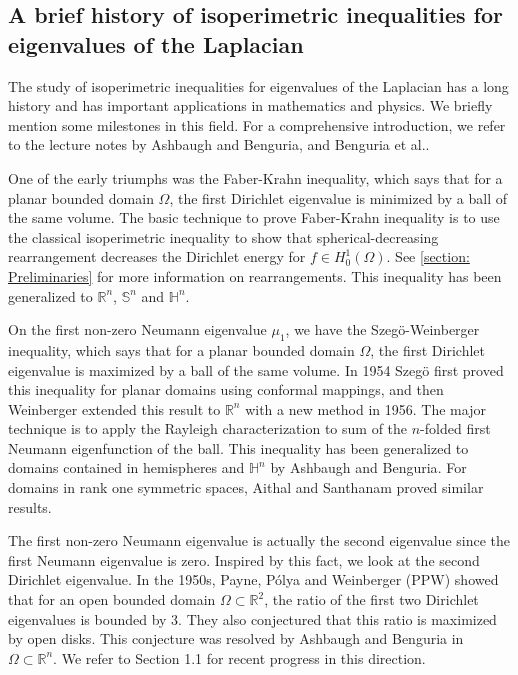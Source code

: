 \documentclass{amsart}
\numberwithin{equation}{section}
\theoremstyle{plain}
\theoremstyle{definition}
\theoremstyle{remark}
\def\RR {\mathbb{R}}
\def\HH {\mathbb{H}}
\def\SS {\mathbb{S}}
\begin{document}
\subsection{A brief history of isoperimetric inequalities for eigenvalues of the Laplacian}\label{brief history}
The study of isoperimetric inequalities for eigenvalues of the Laplacian has a long history and has important applications in mathematics and physics. We briefly mention some milestones in this field. For a comprehensive introduction, we refer to the lecture notes by Ashbaugh and Benguria\cite{ashbaugh2007isoperimetric}, and Benguria et al.\cite{benguria2012isoperimetric}. 
\par One of the early triumphs was the Faber-Krahn inequality, which says that for a planar bounded domain $\Omega$, the first Dirichlet eigenvalue is minimized by a ball of the same volume. The basic technique to prove Faber-Krahn inequality is to use the classical isoperimetric inequality to show that spherical-decreasing rearrangement decreases the Dirichlet energy for $f\in H_0^1(\Omega)$. See \cref{section: Preliminaries} for more information on rearrangements. This inequality has been generalized to $\RR^n$, $\SS^n$ and $\HH^n$. 
\par On the first non-zero Neumann eigenvalue $\mu_1$, we have the Szegö-Weinberger inequality, which says that for a planar bounded domain $\Omega$, the first Dirichlet eigenvalue is maximized by a ball of the same volume. In 1954 Szegö first proved this inequality for planar domains using conformal mappings, and then Weinberger extended this result to $\RR^n$ with a new method in 1956. The major technique is to apply the Rayleigh characterization to sum of the $n$-folded first Neumann eigenfunction of the ball. This inequality has been generalized to domains contained in hemispheres and $\HH^n$ by Ashbaugh and Benguria\cite{ashbaugh1995sharp}. For domains in rank one symmetric spaces, Aithal and Santhanam\cite{aithal1996sharp} proved similar results.
\par The first non-zero Neumann eigenvalue is actually the second eigenvalue since the first Neumann eigenvalue is zero. Inspired by this fact, we look at the second Dirichlet eigenvalue. In the 1950s, Payne, Pólya and Weinberger (PPW) showed that for an open bounded domain $\Omega\subset\RR^2$, the ratio of the first two Dirichlet eigenvalues is bounded by 3\cite{payne1955quotient,payne1956ratio}. They also conjectured that this ratio is maximized by open disks. This conjecture was resolved by Ashbaugh and Benguria in $\Omega\subset\RR^n$. We refer to Section 1.1 for recent progress in this direction. 
\end{document}
